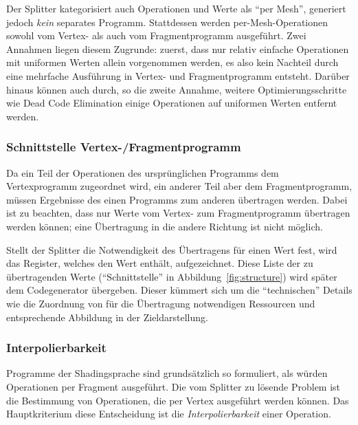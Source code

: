 \documentclass[twoside,a4paper,fleqn,12pt]{article}
\begin{document}
Der Splitter kategorisiert auch Operationen und Werte als "`per Mesh"', generiert jedoch \emph{kein} separates Programm.
Stattdessen werden per-Mesh-Operationen sowohl vom Vertex- als auch vom Fragmentprogramm ausgeführt. Zwei Annahmen
liegen diesem Zugrunde: zuerst, dass nur relativ einfache Operationen mit uniformen Werten allein vorgenommen werden, es also kein
Nachteil durch eine mehrfache Ausführung in Vertex- und Fragmentprogramm entsteht. Darüber hinaus können auch durch, so die zweite Annahme,
weitere Optimierungsschritte wie Dead Code Elimination einige Operationen auf uniformen Werten entfernt werden.


\subsubsection{Schnittstelle Vertex-/Fragmentprogramm}
\label{schnittstelle}

Da ein Teil der Operationen des ursprünglichen Programms dem Vertexprogramm zugeordnet wird, ein anderer Teil aber dem
Fragmentprogramm, müssen Ergebnisse des einen Programms zum anderen übertragen werden.
Dabei ist zu beachten, dass nur Werte vom Vertex- zum Fragmentprogramm übertragen werden können; %
eine Übertragung in die andere Richtung ist nicht möglich.

Stellt der Splitter die Notwendigkeit des Übertragens für einen Wert fest, wird das Register, welches den Wert enthält, aufgezeichnet.
Diese Liste der zu übertragenden Werte ("`Schnittstelle"' in Abbildung~\ref{fig:structure}) wird später dem Codegenerator übergeben.
Dieser kümmert sich um die "`technischen"' Details wie die Zuordnung von für die Übertragung notwendigen Ressourcen und %
entsprechende Abbildung in der Zieldarstellung.

\subsubsection{Interpolierbarkeit}
\label{Interpolierbarkeit}

Programme der Shadingsprache sind grundsätzlich so formuliert, als würden Operationen per Fragment ausgeführt. %
Die vom Splitter zu lösende Problem ist die Bestimmung von Operationen, die per Vertex ausgeführt werden können.
Das Hauptkriterium diese Entscheidung ist die \emph{Interpolierbarkeit} einer Operation.
\end{document}

